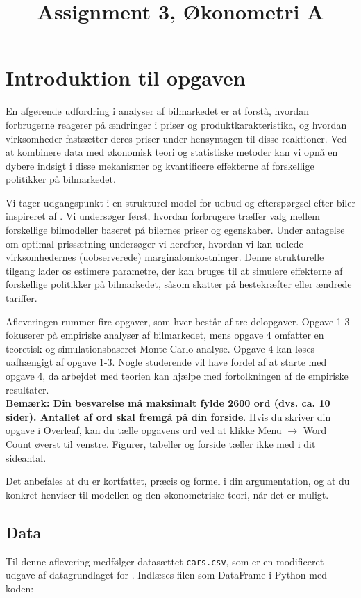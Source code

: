 \documentclass[a4paper,12pt]{article}
\title{Assignment 3, Økonometri A}
\author{}
\begin{document}
\maketitle

\section*{Introduktion til opgaven}
En afgørende udfordring i analyser af bilmarkedet er at forstå, hvordan forbrugerne reagerer på ændringer i priser og produktkarakteristika, og hvordan virksomheder fastsætter deres priser under hensyntagen til disse reaktioner. Ved at kombinere data med økonomisk teori og statistiske metoder kan vi opnå en dybere indsigt i disse mekanismer og kvantificere effekterne af forskellige politikker på bilmarkedet.

Vi tager udgangspunkt i en strukturel model for udbud og efterspørgsel efter biler inspireret af \cite{grieco2024evolution}. Vi undersøger først, hvordan forbrugere træffer valg mellem forskellige bilmodeller baseret på bilernes priser og egenskaber. Under antagelse om optimal prissætning undersøger vi herefter, hvordan vi kan udlede virksomhedernes (uobserverede) marginalomkostninger. Denne strukturelle tilgang lader os estimere parametre, der kan bruges til at simulere effekterne af forskellige politikker på bilmarkedet, såsom skatter på hestekræfter eller ændrede tariffer.

Afleveringen rummer fire opgaver, som hver består af tre delopgaver. Opgave 1-3 fokuserer på empiriske analyser af bilmarkedet, mens opgave 4 omfatter en teoretisk og  simulationsbaseret Monte Carlo-analyse. Opgave 4 kan løses uafhængigt af opgave 1-3. Nogle studerende vil have fordel af at starte med opgave 4, da arbejdet med teorien kan hjælpe med fortolkningen af de empiriske resultater.
\\

\noindent \textbf{Bemærk: Din besvarelse må maksimalt fylde 2600 ord (dvs. ca. 10 sider). Antallet af ord skal fremgå på din forside}. Hvis du skriver din opgave i Overleaf, kan du tælle opgavens ord ved at klikke Menu $\rightarrow$ Word Count øverst til venstre. Figurer, tabeller og forside tæller ikke med i dit sideantal. 

Det anbefales at du er kortfattet, præcis og formel i din argumentation, og at du konkret henviser til modellen og den økonometriske teori, når det er muligt.
\subsection*{Data}
Til denne aflevering medfølger datasættet \texttt{cars.csv}, som er en modificeret udgave af datagrundlaget for \cite{grieco2024evolution}. Indlæses filen som DataFrame i Python med koden:
\end{document}
